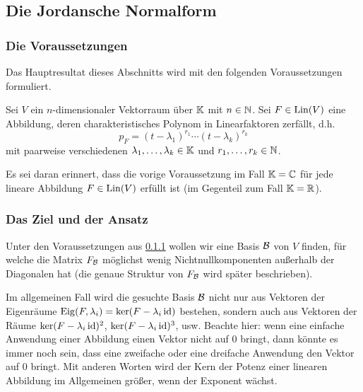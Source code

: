 \clearpage
\subsection{Die Jordansche Normalform}
\label{sec:6_4}

\subsubsection{Die Voraussetzungen}
\label{sec:6_4_1}

Das Hauptresultat dieses Abschnitts wird mit den folgenden Voraussetzungen formuliert.

\begin{tcolorbox}
	Sei $ V $ ein $ n $-dimensionaler Vektorraum über $ \mathbb K $ mit $ n \in \mathbb N $. Sei $ F \in \operatorname{Lin}(V) $ eine Abbildung, deren charakteristisches Polynom in Linearfaktoren zerfällt, d.h.
	\begin{equation*}
		p_F = (t - \lambda_1)^{r_1} \cdots (t - \lambda_k)^{r_k}
	\end{equation*}
	mit paarweise verschiedenen $ \lambda_1, \ldots, \lambda_k \in \mathbb K $ und $ r_1, \ldots, r_k \in \mathbb N $.
\end{tcolorbox}

\noindent Es sei daran erinnert, dass die vorige Voraussetzung im Fall $ \mathbb K = \mathbb C $ für jede lineare Abbildung $ F \in \operatorname{Lin}(V) $ erfüllt ist (im Gegenteil zum Fall $ \mathbb K = \mathbb R $).

\subsubsection{Das Ziel und der Ansatz}

Unter den Voraussetzungen aus \ref{sec:6_4_1} wollen wir eine Basis $ \mathcal{B} $ von $ V $ finden, für welche die Matrix $ F_{\mathcal{B}} $ möglichst wenig Nichtnullkomponenten außerhalb der Diagonalen hat (die genaue Struktur von $ F_{\mathcal{B}} $ wird später beschrieben).

Im allgemeinen Fall wird die gesuchte Basis $ \mathcal{B} $ nicht nur aus Vektoren der Eigenräume $ \operatorname{Eig}(F,\lambda_i) = \ker(F - \lambda_i \operatorname{id}) $ bestehen, sondern auch aus Vektoren der Räume $ \ker(F - \lambda_i \operatorname{id})^2 $, $ \ker(F - \lambda_i \operatorname{id})^3 $, usw. Beachte hier: wenn eine einfache Anwendung einer Abbildung einen Vektor nicht auf $0$ bringt, dann könnte es immer noch sein, dass eine zweifache oder eine dreifache Anwendung den Vektor auf $0$ bringt. Mit anderen Worten wird der Kern der Potenz einer linearen Abbildung im Allgemeinen größer, wenn der Exponent wächst. 

